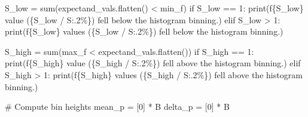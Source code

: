 \documentclass[
  letterpaper,
  DIV=11,
  numbers=noendperiod]{scrartcl}
\newenvironment{Shaded}{\begin{snugshade}}{\end{snugshade}}
\newcommand{\BuiltInTok}[1]{\textcolor[rgb]{0.00,0.23,0.31}{#1}}
\newcommand{\CommentTok}[1]{\textcolor[rgb]{0.37,0.37,0.37}{#1}}
\newcommand{\ControlFlowTok}[1]{\textcolor[rgb]{0.00,0.23,0.31}{#1}}
\newcommand{\DecValTok}[1]{\textcolor[rgb]{0.68,0.00,0.00}{#1}}
\newcommand{\NormalTok}[1]{\textcolor[rgb]{0.00,0.23,0.31}{#1}}
\newcommand{\OperatorTok}[1]{\textcolor[rgb]{0.37,0.37,0.37}{#1}}
\newcommand{\SpecialCharTok}[1]{\textcolor[rgb]{0.37,0.37,0.37}{#1}}
\newcommand{\SpecialStringTok}[1]{\textcolor[rgb]{0.13,0.47,0.30}{#1}}
\newcommand{\StringTok}[1]{\textcolor[rgb]{0.13,0.47,0.30}{#1}}
\begin{document}
\begin{Shaded}
\begin{Highlighting}[]
\NormalTok{  S\_low }\OperatorTok{=} \BuiltInTok{sum}\NormalTok{(expectand\_vals.flatten() }\OperatorTok{\textless{}}\NormalTok{ min\_f)}
  \ControlFlowTok{if}\NormalTok{ S\_low }\OperatorTok{==} \DecValTok{1}\NormalTok{:}
    \BuiltInTok{print}\NormalTok{(}\SpecialStringTok{f\textquotesingle{}}\SpecialCharTok{\{}\NormalTok{S\_low}\SpecialCharTok{\}}\SpecialStringTok{ value (}\SpecialCharTok{\{}\NormalTok{S\_low }\OperatorTok{/}\NormalTok{ S}\SpecialCharTok{:.2\%\}}\SpecialStringTok{)\textquotesingle{}}
           \StringTok{\textquotesingle{} fell below the histogram binning.\textquotesingle{}}\NormalTok{)}
  \ControlFlowTok{elif}\NormalTok{ S\_low }\OperatorTok{\textgreater{}} \DecValTok{1}\NormalTok{:}
    \BuiltInTok{print}\NormalTok{(}\SpecialStringTok{f\textquotesingle{}}\SpecialCharTok{\{}\NormalTok{S\_low}\SpecialCharTok{\}}\SpecialStringTok{ values (}\SpecialCharTok{\{}\NormalTok{S\_low }\OperatorTok{/}\NormalTok{ S}\SpecialCharTok{:.2\%\}}\SpecialStringTok{)\textquotesingle{}}
           \StringTok{\textquotesingle{} fell below the histogram binning.\textquotesingle{}}\NormalTok{)}

\NormalTok{  S\_high }\OperatorTok{=} \BuiltInTok{sum}\NormalTok{(max\_f }\OperatorTok{\textless{}}\NormalTok{ expectand\_vals.flatten())}
  \ControlFlowTok{if}\NormalTok{ S\_high }\OperatorTok{==} \DecValTok{1}\NormalTok{:}
    \BuiltInTok{print}\NormalTok{(}\SpecialStringTok{f\textquotesingle{}}\SpecialCharTok{\{}\NormalTok{S\_high}\SpecialCharTok{\}}\SpecialStringTok{ value (}\SpecialCharTok{\{}\NormalTok{S\_high }\OperatorTok{/}\NormalTok{ S}\SpecialCharTok{:.2\%\}}\SpecialStringTok{)\textquotesingle{}}
           \StringTok{\textquotesingle{} fell above the histogram binning.\textquotesingle{}}\NormalTok{)}
  \ControlFlowTok{elif}\NormalTok{ S\_high }\OperatorTok{\textgreater{}} \DecValTok{1}\NormalTok{:}
    \BuiltInTok{print}\NormalTok{(}\SpecialStringTok{f\textquotesingle{}}\SpecialCharTok{\{}\NormalTok{S\_high}\SpecialCharTok{\}}\SpecialStringTok{ values (}\SpecialCharTok{\{}\NormalTok{S\_high }\OperatorTok{/}\NormalTok{ S}\SpecialCharTok{:.2\%\}}\SpecialStringTok{)\textquotesingle{}}
           \StringTok{\textquotesingle{} fell above the histogram binning.\textquotesingle{}}\NormalTok{)}

  \CommentTok{\# Compute bin heights}
\NormalTok{  mean\_p }\OperatorTok{=}\NormalTok{ [}\DecValTok{0}\NormalTok{] }\OperatorTok{*}\NormalTok{ B}
\NormalTok{  delta\_p }\OperatorTok{=}\NormalTok{ [}\DecValTok{0}\NormalTok{] }\OperatorTok{*}\NormalTok{ B}


\end{Highlighting}
\end{Shaded}
\end{document}
